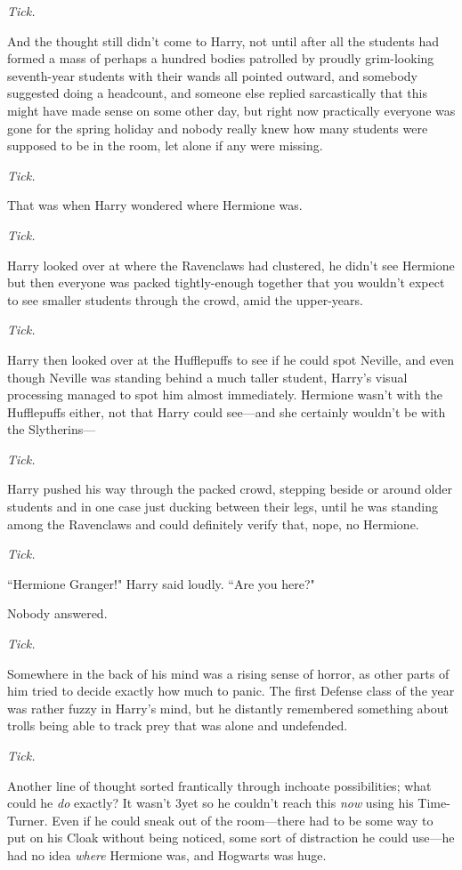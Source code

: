 \emph{Tick.}

And the thought still didn't come to Harry, not until after all the students had formed a mass of perhaps a hundred bodies patrolled by proudly grim-looking seventh-year students with their wands all pointed outward, and somebody suggested doing a headcount, and someone else replied sarcastically that this might have made sense on some other day, but right now practically everyone was gone for the spring holiday and nobody really knew how many students were supposed to be in the room, let alone if any were missing.

\emph{Tick.}

That was when Harry wondered where Hermione was.

\emph{Tick.}

Harry looked over at where the Ravenclaws had clustered, he didn't see Hermione but then everyone was packed tightly-enough together that you wouldn't expect to see smaller students through the crowd, amid the upper-years.

\emph{Tick.}

Harry then looked over at the Hufflepuffs to see if he could spot Neville, and even though Neville was standing behind a much taller student, Harry's visual processing managed to spot him almost immediately. Hermione wasn't with the Hufflepuffs either, not that Harry could see—and she certainly wouldn't be with the Slytherins—

\emph{Tick.}

Harry pushed his way through the packed crowd, stepping beside or around older students and in one case just ducking between their legs, until he was standing among the Ravenclaws and could definitely verify that, nope, no Hermione.

\emph{Tick.}

``Hermione Granger!" Harry said loudly. ``Are you here?"

Nobody answered.

\emph{Tick.}

Somewhere in the back of his mind was a rising sense of horror, as other parts of him tried to decide exactly how much to panic. The first Defense class of the year was rather fuzzy in Harry's mind, but he distantly remembered something about trolls being able to track prey that was alone and undefended.

\emph{Tick.}

Another line of thought sorted frantically through inchoate possibilities; what could he \emph{do} exactly? It wasn't 3\pm yet so he couldn't reach this \emph{now} using his Time-Turner. Even if he could sneak out of the room—there had to be some way to put on his Cloak without being noticed, some sort of distraction he could use—he had no idea \emph{where} Hermione was, and Hogwarts was huge.

